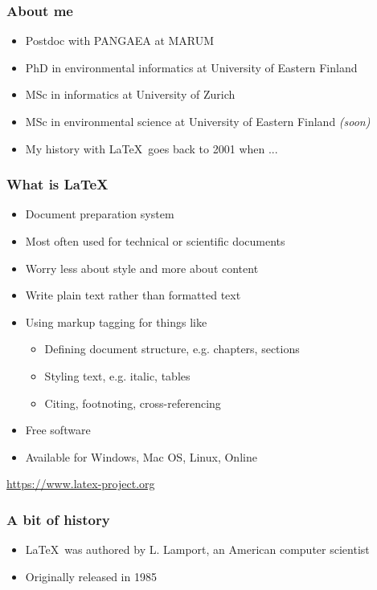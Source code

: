 \documentclass{beamer}
\begin{document}
\begin{frame}
  \frametitle{About me}
  
  \begin{itemize}
  \item Postdoc with PANGAEA at MARUM
  \item PhD in environmental informatics at University of Eastern Finland
  \item MSc in informatics at University of Zurich
  \item MSc in environmental science at University of Eastern Finland \emph{(soon)}
  \item My history with \LaTeX~goes back to 2001 when ...
  \end{itemize}

\end{frame}

\begin{frame}
  \frametitle{What is \LaTeX}
  
  \begin{itemize}
  \item Document preparation system
  \item Most often used for technical or scientific documents
  \item Worry less about style and more about content
  \item Write plain text rather than formatted text
  \item Using markup tagging for things like
  \begin{itemize}
  \item Defining document structure, e.g. chapters, sections
  \item Styling text, e.g. italic, tables
  \item Citing, footnoting, cross-referencing
  \end{itemize}
  \item Free software
  \item Available for Windows, Mac OS, Linux, Online
  \end{itemize}
  
  \begin{flushright}
  \url{https://www.latex-project.org}
  \end{flushright}

\end{frame}


\begin{frame}
  \frametitle{A bit of history}
  
  \begin{itemize}
  \item \LaTeX~was authored by L. Lamport, an American computer scientist
  \item Originally released in 1985
  \end{itemize}

\end{frame}
\end{document}

